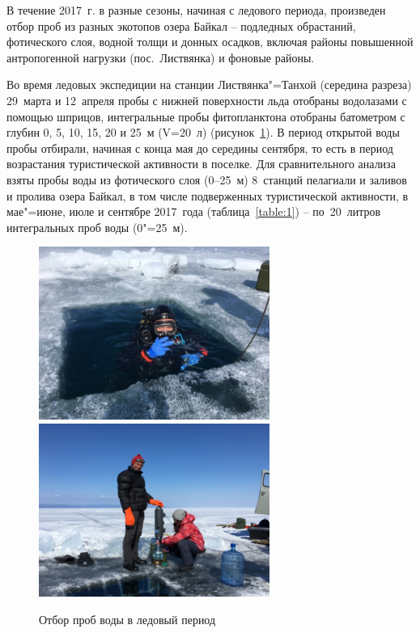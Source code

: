 \documentclass[a4paper,12pt,openany,final]{extreport}
\newcommand\theyear{2017}
\def\oldcaption{} \let\oldcaption=\caption
\def\caption{\stepcounter{captionsnum}\oldcaption}
\begin{document}
В течение \theyear{}~г. в разные сезоны, начиная с ледового периода, произведен отбор проб из разных экотопов озера Байкал -- подледных обрастаний, фотического слоя, водной толщи и донных осадков, включая районы повышенной антропогенной нагрузки (пос.~Листвянка) и фоновые районы.

Во время ледовых экспедиции на станции Листвянка"=Танхой (середина разреза) 29~марта и 12~апреля пробы с нижней поверхности льда отобраны водолазами с помощью шприцов, интегральные пробы фитопланктона отобраны батометром с глубин 0, 5, 10, 15, 20 и 25~м (V=20~л) (рисунок~\ref{fig:photo1}). В период открытой воды пробы отбирали, начиная с конца мая до середины сентября, то есть в период возрастания туристической активности в поселке. Для сравнительного анализа взяты пробы воды из фотического слоя (0--25~м) 8~станций пелагиали и заливов и пролива озера Байкал, в том числе подверженных туристической активности, в мае"=июне, июле и сентябре 2017~года (таблица~\ref{table:1}) -- по~20~литров интегральных проб воды (0"=25~м).

\begin{figure}\centering
  \includegraphics[height=2.23in]{media/image1.jpeg}\quad
  \includegraphics[height=2.23in]{media/image2.jpeg}
  \caption{ Отбор  проб  воды  в  ледовый  период }\label{fig:photo1}
\end{figure}
\end{document}

